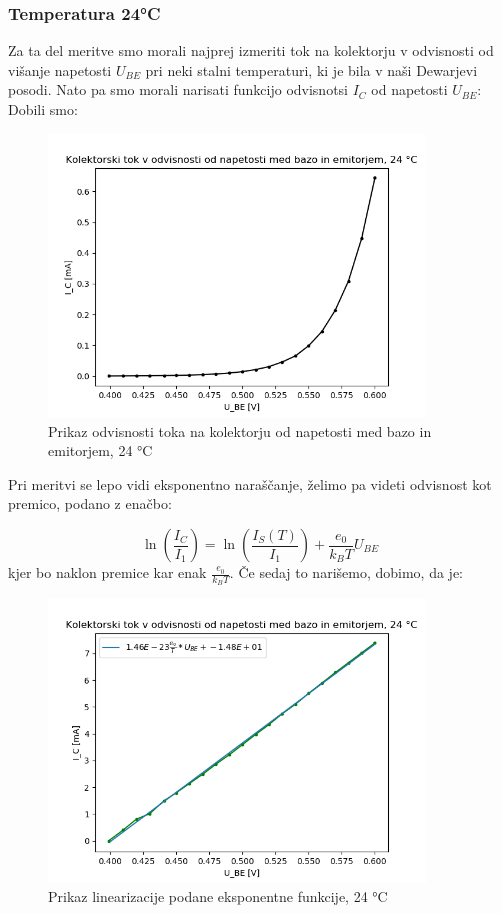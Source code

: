 \documentclass[11pt, a4paper]{article}
\theoremstyle{definition}
\theoremstyle{example}
\theoremstyle{izrek}
\begin{document}
\subsubsection{Temperatura 24°C}
Za ta del meritve smo morali najprej izmeriti tok na kolektorju v odvisnosti od višanje napetosti $U_{BE}$ pri neki stalni temperaturi, ki je bila v naši Dewarjevi posodi. Nato pa smo morali narisati funkcijo odvisnotsi $I_C$ od napetosti $U_{BE}$:
Dobili smo:
\begin{figure}[H]
    \centering
    \includegraphics[width=10cm]{Napetost-tok,24.png}
    \caption{Prikaz odvisnosti toka na kolektorju od napetosti med bazo in emitorjem, 24 °C}
\end{figure}
Pri meritvi se lepo vidi eksponentno naraščanje, želimo pa videti odvisnost kot premico, podano z enačbo:

$$\ln(\frac{I_C}{I_1})=\ln(\frac{I_S(T)}{I_1})+\frac{e_0}{k_B T} U_{BE}$$
kjer bo naklon premice kar enak $\frac{e_0}{k_B T}$.
Če sedaj to narišemo, dobimo, da je:
\begin{figure}[H]
    \centering
    \includegraphics[width=10cm]{Napetost-tok_fit,24.png}
    \caption{Prikaz linearizacije podane eksponentne funkcije, 24 °C}
\end{figure}
\end{document}
